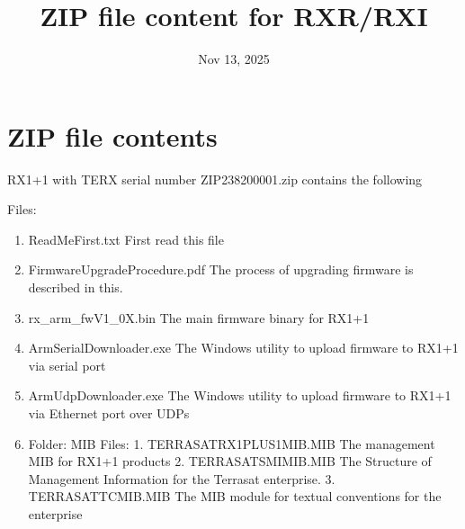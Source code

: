 \documentclass[letterpaper,10pt,english]{sphinxhowto}
\title{ZIP file content for RXR/RXI}
\date{Nov 13, 2025}
\author{}
\begin{document}
\pagestyle{empty}

\pagestyle{plain}

\pagestyle{normal}
\label{\detokenize{index::doc}}


\sphinxstepscope


\section{ZIP file contents}
\label{\detokenize{topics/zip_contents:zip-file-contents}}\label{\detokenize{topics/zip_contents::doc}}
\sphinxAtStartPar
RX1+1 with TERX serial number ZIP\sphinxhyphen{}23820\sphinxhyphen{}0001.zip contains the following

\sphinxAtStartPar
Files:
\begin{enumerate}
%
\item {} 
\sphinxAtStartPar
ReadMeFirst.txt \sphinxhyphen{} First read this file

\item {} 
\sphinxAtStartPar
FirmwareUpgradeProcedure.pdf \sphinxhyphen{} The process of upgrading firmware is described in this.

\item {} 
\sphinxAtStartPar
rx\_arm\_fwV1\_0X.bin \sphinxhyphen{} The main firmware binary for RX1+1

\item {} 
\sphinxAtStartPar
ArmSerialDownloader.exe \sphinxhyphen{} The Windows utility to upload firmware to RX1+1 via serial port

\item {} 
\sphinxAtStartPar
ArmUdpDownloader.exe \sphinxhyphen{} The Windows utility to upload firmware to RX1+1 via Ethernet port over UDPs

\item {} 
\sphinxAtStartPar
Folder: MIB
Files:
1. TERRASAT\sphinxhyphen{}RX1PLUS1\sphinxhyphen{}MIB.MIB \sphinxhyphen{} The management MIB for RX1+1 products
2. TERRASAT\sphinxhyphen{}SMI\sphinxhyphen{}MIB.MIB      \sphinxhyphen{} The Structure of Management Information for the Terrasat enterprise.
3. TERRASAT\sphinxhyphen{}TC\sphinxhyphen{}MIB.MIB       \sphinxhyphen{} The MIB module for textual conventions for the enterprise

\end{enumerate}



\renewcommand{\indexname}{Index}
\printindex
\end{document}
